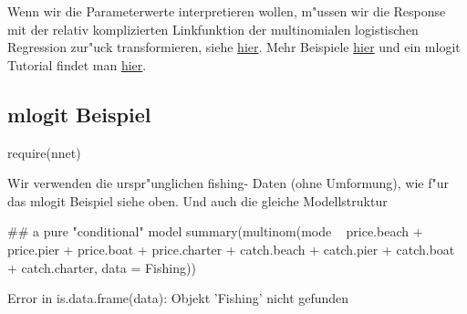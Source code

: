 \documentclass[a4paper,twoside]{tufte-book}\usepackage[]{graphicx}\usepackage[]{color}
\begin{document}
\begin{appendices}
Wenn wir die Parameterwerte interpretieren wollen, m"ussen wir die Response mit der relativ komplizierten Linkfunktion der multinomialen logistischen Regression zur"uck transformieren, siehe \href{http://en.wikipedia.org/wiki/Multinomial_logistic_regression}{hier}. Mehr Beispiele \href{http://www.inside-r.org/packages/cran/mlogit/docs/suml}{hier} und ein mlogit Tutorial findet man \href{http://cran.r-project.org/web/packages/mlogit/vignettes/Exercises.pdf}{hier}.

\subsection{mlogit Beispiel}

\begin{Schunk}
\begin{Sinput}
require(nnet)
\end{Sinput}
\end{Schunk}

Wir verwenden die urspr"unglichen fishing- Daten (ohne Umformung), wie f"ur das mlogit Beispiel siehe oben.
Und auch die gleiche Modellstruktur

\begin{Schunk}
\begin{Sinput}
## a pure "conditional" model
summary(multinom(mode ~ price.beach + price.pier + price.boat + price.charter + 
                   catch.beach + catch.pier + catch.boat + catch.charter, data = Fishing))
\end{Sinput}
\begin{Soutput}
Error in is.data.frame(data): Objekt 'Fishing' nicht gefunden
\end{Soutput}
\end{Schunk}
\end{appendices}


 
\end{document}
